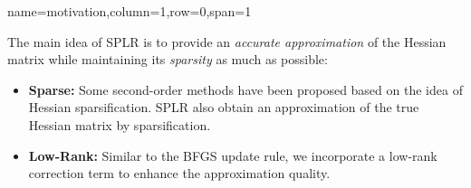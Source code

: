 {name=motivation,column=1,row=0,span=1}
{
    The main idea of SPLR is to provide an \emph{accurate approximation} of the Hessian matrix while maintaining its \emph{sparsity} as much as possible:
    \begin{itemize}
        \item \textbf{\color{sufered} Sparse:} Some second-order methods have been proposed based on the idea of Hessian sparsification. SPLR also obtain an approximation of the true Hessian matrix by sparsification.
        \item \textbf{\color{sufered} Low-Rank:} Similar to the BFGS update rule, we incorporate a low-rank correction term to enhance the approximation quality.
    \end{itemize}
}